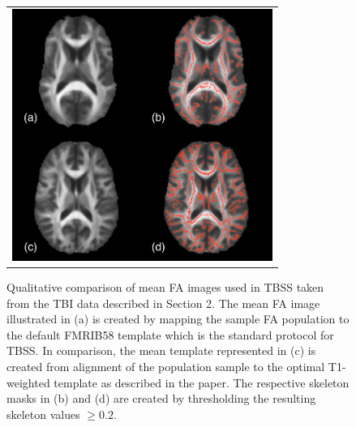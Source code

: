 \documentclass[final,5p,times,twocolumn]{elsarticle}
\begin{document}
\begin{figure}
\begin{center}
\begin{tabular}{c}
  \includegraphics[width=85mm]{meanFA.pdf}
\end{tabular}
\caption{Qualitative comparison of mean FA images used in TBSS taken from the TBI data described in Section 2.  The mean FA image illustrated in (a) is created by mapping the sample FA population to the default FMRIB58 template which is the standard protocol for TBSS.  In comparison, the mean template represented in (c) is created from alignment of the population sample to the optimal T1-weighted template as described in the paper. The respective skeleton masks in (b) and (d) are created by thresholding the resulting skeleton values $\geq 0.2$.  }
\label{fig:meanFA}
\end{center}
\end{figure}

\end{document}
